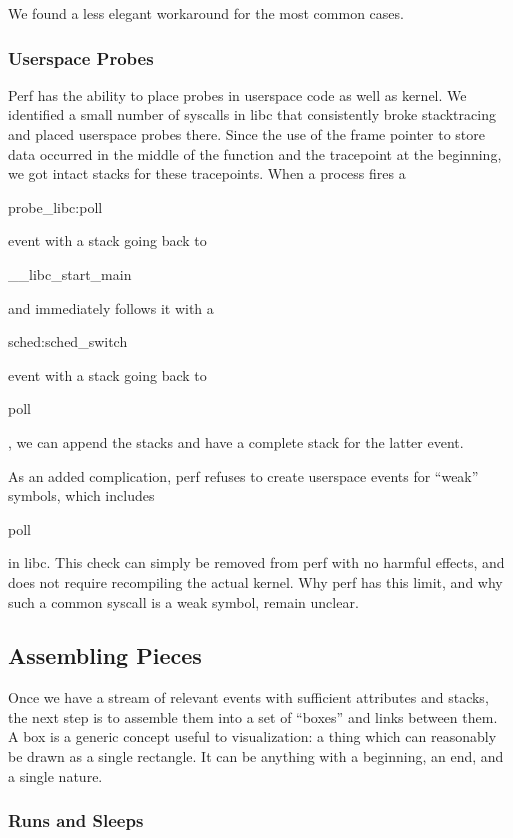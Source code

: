 \documentclass[10pt]{article}
\begin{document}
We found a less elegant workaround for the most common cases.

\subsubsection{Userspace Probes}

Perf has the ability to place probes in userspace code as well as kernel.  We identified a small number of syscalls in libc that consistently broke stacktracing and placed userspace probes there.  Since the use of the frame pointer to store data occurred in the middle of the function and the tracepoint at the beginning, we got intact stacks for these tracepoints.  When a process fires a \begin{tt}probe\_libc:poll\end{tt} event with a stack going back to \begin{tt}\_\_libc\_start\_main\end{tt} and immediately follows it with a \begin{tt}sched:sched\_switch\end{tt} event with a stack going back to \begin{tt}poll\end{tt}, we can append the stacks and have a complete stack for the latter event.

As an added complication, perf refuses to create userspace events for ``weak'' symbols, which includes \begin{tt}poll\end{tt} in libc.  This check can simply be removed from perf with no harmful effects, and does not require recompiling the actual kernel.  Why perf has this limit, and why such a common syscall is a weak symbol, remain unclear.

\subsection{Assembling Pieces}

Once we have a stream of relevant events with sufficient attributes and stacks, the next step is to assemble them into a set of ``boxes'' and links between them.  A box is a generic concept useful to visualization: a thing which can reasonably be drawn as a single rectangle.  It can be anything with a beginning, an end, and a single nature.

\subsubsection{Runs and Sleeps}
\end{document}
